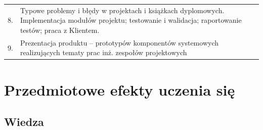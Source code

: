 \documentclass[12pt, a4paper]{article}
\begin{document}
{\begin{longtable}{m{1.5cm}m{14.5cm}}
  \rowcolor{tableRowAlt} 8. & Typowe problemy i błędy w projektach i książkach dyplomowych. Implementacja modułów projektu; testowanie i walidacja; raportowanie testów; praca z Klientem. \\
  \rowcolor{tableRowLight} 9. & Prezentacja produktu – prototypów komponentów systemowych realizujących tematy prac inż. zespołów projektowych \\
\bottomrule
\end{longtable}}

\section{Przedmiotowe efekty uczenia się}

\subsection*{Wiedza}
\end{document}
